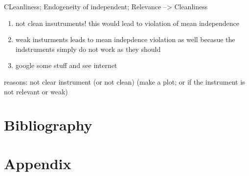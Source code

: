 \documentclass[a4paper]{article}
\begin{document}
CLeanliness; Endogeneity of independent; Relevance
--> Cleanliness 


\begin{enumerate}
   \item not clean insutruments! this would lead to violation of mean independence
   \item weak insturments leads to mean indepdence violation as well becasue the indstruments simply do not work as they should 
   \item google some stuff and see internet
\end{enumerate}



reasons: not clear instrument (or not clean) (make a plot; or if the instrument is not relevant or weak)














\section{Bibliography}






\section{Appendix}
\end{document}
